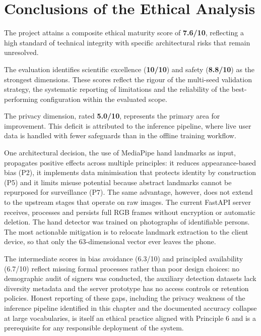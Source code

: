 \section{Conclusions of the Ethical Analysis}

The project attains a composite ethical maturity score of \textbf{7.6/10}, reflecting a high
standard of technical integrity with specific architectural risks that remain unresolved.

The evaluation identifies scientific excellence (\textbf{10/10}) and safety (\textbf{8.8/10}) as
the strongest dimensions. These scores reflect the rigour of the multi-seed validation strategy,
the systematic reporting of limitations and the reliability of the best-performing configuration
within the evaluated scope.

The privacy dimension, rated \textbf{5.0/10}, represents the primary area for improvement. This
deficit is attributed to the inference pipeline, where live user data is handled with fewer
safeguards than in the offline training workflow.

One architectural decision, the use of MediaPipe hand landmarks as input, propagates positive
effects across multiple principles: it reduces appearance-based bias (P2), it implements data
minimisation that protects identity by construction (P5) and it limits misuse potential because
abstract landmarks cannot be repurposed for surveillance (P7). The same advantage, however, does
not extend to the upstream stages that operate on raw images. The current FastAPI server receives,
processes and persists full RGB frames without encryption or automatic deletion. The hand detector
was trained on photographs of identifiable persons. The most actionable mitigation is to relocate
landmark extraction to the client device, so that only the 63-dimensional vector ever leaves the
phone.

The intermediate scores in bias avoidance (6.3/10) and principled availability (6.7/10) reflect
missing formal processes rather than poor design choices: no demographic audit of signers was
conducted, the auxiliary detection datasets lack diversity metadata and the server prototype has no
access controls or retention policies. Honest reporting of these gaps, including the privacy
weakness of the inference pipeline identified in this chapter and the documented accuracy collapse
at large vocabularies, is itself an ethical practice aligned with Principle 6 and is a prerequisite
for any responsible deployment of the system.
